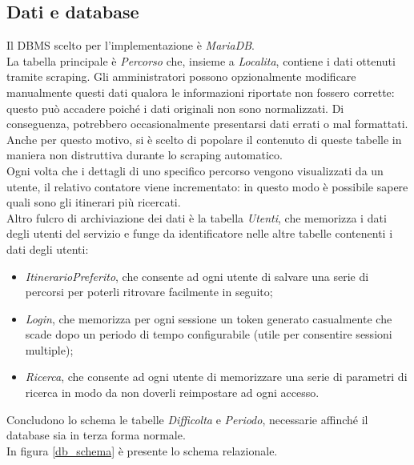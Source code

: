 \documentclass[11pt]{report}
\begin{document}
\subsection{Dati e database}
Il DBMS scelto per l'implementazione è \textit{MariaDB}.
\\La tabella principale è \textit{Percorso} che, insieme a \textit{Localita}, contiene i dati ottenuti tramite scraping.
Gli amministratori possono opzionalmente modificare manualmente questi dati qualora le informazioni riportate non fossero corrette: questo può accadere poiché i dati originali non sono normalizzati.
Di conseguenza, potrebbero occasionalmente presentarsi dati errati o mal formattati.
Anche per questo motivo, si è scelto di popolare il contenuto di queste tabelle in maniera non distruttiva durante lo scraping automatico.
\\Ogni volta che i dettagli di uno specifico percorso vengono visualizzati da un utente, il relativo contatore viene incrementato: in questo modo è possibile sapere quali sono gli itinerari più ricercati.
\\Altro fulcro di archiviazione dei dati è la tabella \textit{Utenti}, che memorizza i dati degli utenti del servizio e funge da identificatore nelle altre tabelle contenenti i dati degli utenti:
\begin{itemize}
	\item \textit{ItinerarioPreferito}, che consente ad ogni utente di salvare una serie di percorsi per poterli ritrovare facilmente in seguito;
	\item \textit{Login}, che memorizza per ogni sessione un token generato casualmente che scade dopo un periodo di tempo configurabile (utile per consentire sessioni multiple);
	\item \textit{Ricerca}, che consente ad ogni utente di memorizzare una serie di parametri di ricerca in modo da non doverli reimpostare ad ogni accesso.
\end{itemize}
Concludono lo schema le tabelle \textit{Difficolta} e \textit{Periodo}, necessarie affinché il database sia in terza forma normale.
\\In figura \ref{db_schema} è presente lo schema relazionale.
\end{document}
